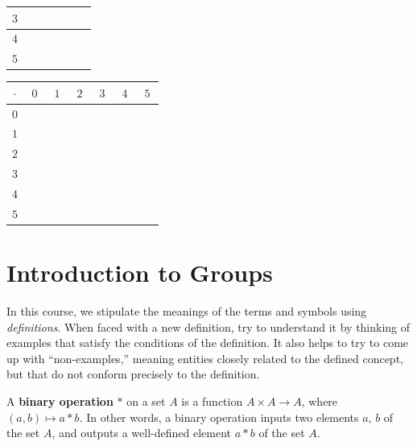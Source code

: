 \begin{enumerate}
\begin{center}
\begin{tabular}{|c||c|c|c|c|c|c|}
        $3$ & & & & & & \\ \hline
        $4$ & & & & & & \\ \hline
        $5$ & & & & & & \\ \hline
    \end{tabular}
    \hspace{0.5in}
    \begin{tabular}{|c||c|c|c|c|c|c|} \hline
        $\cdot$ & $0$ & $1$ & $2$ & $3$ & $4$ & $5$ \\ \hline \hline
        $0$ & $\phantom{00}$ & $\phantom{00}$ & $\phantom{00}$ & $\phantom{00}$ & $\phantom{00}$ & $\phantom{00}$ \\ \hline
        $1$ & & & & & & \\ \hline
        $2$ & & & & & & \\ \hline
        $3$ & & & & & & \\ \hline
        $4$ & & & & & & \\ \hline
        $5$ & & & & & & \\ \hline
    \end{tabular}
    \end{center}
\end{enumerate}

\chapter{Introduction to Groups}

In this course, we stipulate the meanings of the terms and symbols using \textit{definitions}. When faced with a new definition, try to understand it by thinking of examples that satisfy the conditions of the definition.  It also helps to try to come up with ``non-examples,'' meaning entities closely related to the defined concept, but that do not conform precisely to the definition.

\begin{definition}
    A \textbf{binary operation} \(*\) on a set \(A\) is a function \(A \times A \rightarrow A\), where \((a,b) \mapsto a*b\).  In other words, a binary operation inputs two elements \(a\), \(b\) of the set \(A\), and outputs a well-defined element \(a * b\) of the set \(A\).
\end{definition}

